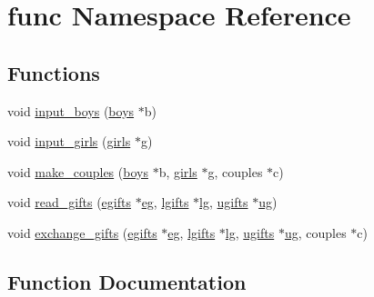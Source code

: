 \hypertarget{namespacefunc}{}\section{func Namespace Reference}
\label{namespacefunc}
\subsection*{Functions}
\begin{DoxyCompactItemize}
\item 
void \hyperlink{namespacefunc_abd34b28971356ea1d2ac2c5ff2b15cc8}{input\+\_\+boys} (\hyperlink{classinfo_1_1boys}{boys} $\ast$b)
\item 
void \hyperlink{namespacefunc_ae1456c47a6125b2cbed9a6d4e6a95296}{input\+\_\+girls} (\hyperlink{classinfo_1_1girls}{girls} $\ast$g)
\item 
void \hyperlink{namespacefunc_a5bdfb340927de98cb50c3527ae2da0c6}{make\+\_\+couples} (\hyperlink{classinfo_1_1boys}{boys} $\ast$b, \hyperlink{classinfo_1_1girls}{girls} $\ast$g, couples $\ast$c)
\item 
void \hyperlink{namespacefunc_a014bc428ac2cf6930dbc224ae4e25829}{read\+\_\+gifts} (\hyperlink{classinfo_1_1egifts}{egifts} $\ast$\hyperlink{variables_8hpp_a5c4faa4b3664cb87e42828582be8218c}{eg}, \hyperlink{classinfo_1_1lgifts}{lgifts} $\ast$\hyperlink{variables_8hpp_af0e878fe008072b8e4f4f873131e4a45}{lg}, \hyperlink{classinfo_1_1ugifts}{ugifts} $\ast$\hyperlink{variables_8hpp_a8202961579406f306388a133fe6a566e}{ug})
\item 
void \hyperlink{namespacefunc_a42e0aa9b334d3a9188f85a7af789a104}{exchange\+\_\+gifts} (\hyperlink{classinfo_1_1egifts}{egifts} $\ast$\hyperlink{variables_8hpp_a5c4faa4b3664cb87e42828582be8218c}{eg}, \hyperlink{classinfo_1_1lgifts}{lgifts} $\ast$\hyperlink{variables_8hpp_af0e878fe008072b8e4f4f873131e4a45}{lg}, \hyperlink{classinfo_1_1ugifts}{ugifts} $\ast$\hyperlink{variables_8hpp_a8202961579406f306388a133fe6a566e}{ug}, couples $\ast$c)
\end{DoxyCompactItemize}


\subsection{Function Documentation}
\mbox{\label{namespacefunc_a42e0aa9b334d3a9188f85a7af789a104}} 

